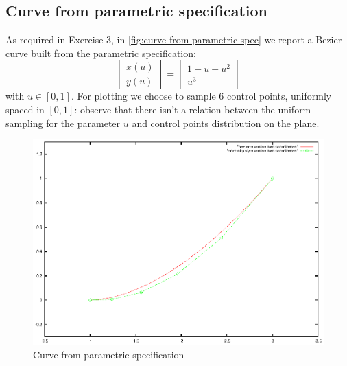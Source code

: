 \documentclass{article}
\begin{document}
\subsection{Curve from parametric specification}
As required in Exercise 3, in \autoref{fig:curve-from-parametric-spec}
we report a Bezier curve built from the parametric specification:
\begin{displaymath}
  \left [  \begin{array}{c}
      x(u) \\
      y(u)
    \end{array} \right ] = \left [  
    \begin{array}{c}
      1 + u + u^2 \\
      u^3
    \end{array} \right ]
\end{displaymath}
with $u\in[0,1]$. For plotting we choose to sample 6 control points,
uniformly spaced in $[0,1]$: observe that there isn't a relation
between the uniform sampling for the parameter $u$ and control points
distribution on the plane.

\begin{figure}
  \centering
  \includegraphics{bezier-deCasteljau-curves/exercise-two}
  \caption{Curve from parametric specification}
  \label{fig:curve-from-parametric-spec}
\end{figure}
\end{document}
